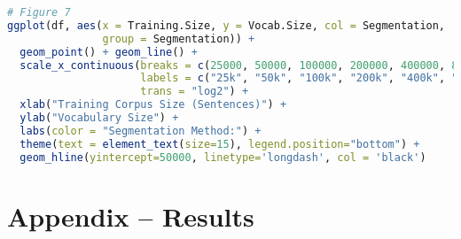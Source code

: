 \documentclass[11pt]{article}
\begin{document}
\begin{lstlisting}[language=R]
# Figure 7
ggplot(df, aes(x = Training.Size, y = Vocab.Size, col = Segmentation,
               group = Segmentation)) + 
  geom_point() + geom_line() +
  scale_x_continuous(breaks = c(25000, 50000, 100000, 200000, 400000, 800000),
                     labels = c("25k", "50k", "100k", "200k", "400k", "800k"),
                     trans = "log2") +
  xlab("Training Corpus Size (Sentences)") +
  ylab("Vocabulary Size") +
  labs(color = "Segmentation Method:") +
  theme(text = element_text(size=15), legend.position="bottom") + 
  geom_hline(yintercept=50000, linetype='longdash', col = 'black')

\end{lstlisting}




\section{Appendix -- Results}
\end{document}
